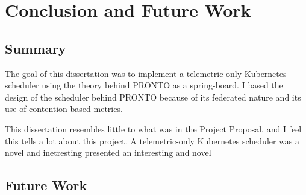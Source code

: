 \chapter{Conclusion and Future Work}

%
%

\section{Summary}
The goal of this dissertation was to implement a telemetric-only Kubernetes
scheduler using the theory behind PRONTO as a spring-board. I based the design
of the scheduler behind PRONTO because of its federated nature and its use of
contention-based metrics.


This dissertation resembles little to what was in the Project Proposal, and I
feel this tells a lot about this project. A telemetric-only Kubernetes scheduler
was a novel and inetresting
presented an interesting and novel


\section{Future Work}
